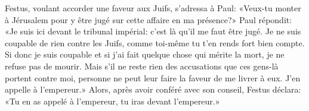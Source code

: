 Festus, voulant accorder une faveur aux Juifs, s’adressa à Paul:
	«Veux-tu monter à Jérusalem pour y être jugé sur cette affaire en ma présence?»
Paul répondit: «Je suis ici devant le tribunal impérial:
	c’est là qu’il me faut être jugé.
	Je ne suis coupable de rien contre les Juifs,
	comme toi-même tu t’en rends fort bien compte.
Si donc je suis coupable et si j’ai fait quelque chose qui mérite la mort,
	je ne refuse pas de mourir.
Mais s’il ne reste rien des accusations que ces gens-là portent contre moi,
	personne ne peut leur faire la faveur de me livrer à eux.
	J’en appelle à l’empereur.»
Alors, après avoir conféré avec son conseil, Festus déclara:
	«Tu en as appelé à l’empereur, tu iras devant l’empereur.»

